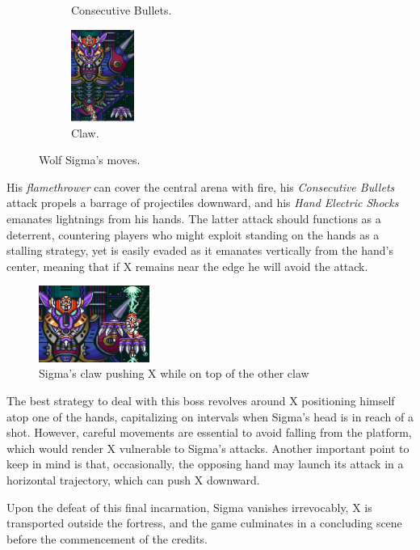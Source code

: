 \begin{figure}[htp]
\begin{subfigure}{0.3\linewidth}
		\caption{Consecutive Bullets.}
	\end{subfigure}
	\begin{subfigure}{0.25\linewidth}
		\centering
		\includegraphics[height=3cm]{figures/X1/Sigma_stages/WolfSigma_claw.jpg}
		\caption{Claw.}
	\end{subfigure}
	\caption{Wolf Sigma's moves.}
\end{figure} His \emph{flamethrower} can cover the central arena with fire, his \emph{Consecutive Bullets} attack propels a barrage of projectiles downward, and his \emph{Hand Electric Shocks} emanates lightnings from his hands. The latter attack should functions as a deterrent, countering players who might exploit standing on the hands as a stalling strategy, yet is easily evaded as it emanates vertically from the hand's center, meaning that if X remains near the edge he will avoid the attack. \begin{figure}[htp]
	\centering
	\includegraphics[height=2.5cm]{figures/X1/Sigma_stages/WolfSigma_claw_2.jpg}
	\caption{Sigma's claw pushing X while on top of the other claw}
\end{figure}

The best strategy to deal with this boss  revolves around X positioning himself atop one of the hands, capitalizing on intervals when  Sigma's head is in reach of a shot. However, careful movements are essential to avoid falling from the platform, which would render X vulnerable to Sigma's attacks. Another important point to keep in mind is that, occasionally, the opposing hand may launch its attack in a horizontal trajectory, which can push X downward.


Upon the defeat of this final incarnation, Sigma vanishes irrevocably, X is transported outside the fortress, and the game culminates in a concluding scene before the commencement of the credits.

